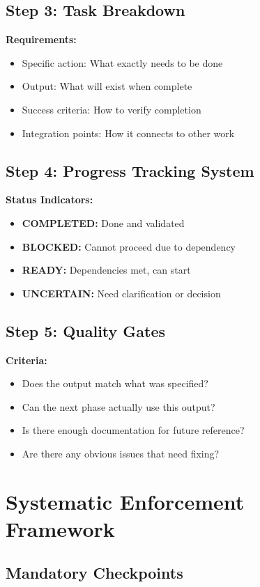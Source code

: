 \documentclass{article}
\begin{document}
\subsection{Step 3: Task Breakdown}
\textbf{Requirements:}
\begin{itemize}[noitemsep]
\item Specific action: What exactly needs to be done
\item Output: What will exist when complete
\item Success criteria: How to verify completion
\item Integration points: How it connects to other work
\end{itemize}

\subsection{Step 4: Progress Tracking System}
\textbf{Status Indicators:}
\begin{itemize}[noitemsep]
\item \textbf{COMPLETED:} Done and validated
\item \textbf{BLOCKED:} Cannot proceed due to dependency
\item \textbf{READY:} Dependencies met, can start
\item \textbf{UNCERTAIN:} Need clarification or decision
\end{itemize}

\subsection{Step 5: Quality Gates}
\textbf{Criteria:}
\begin{itemize}[noitemsep]
\item Does the output match what was specified?
\item Can the next phase actually use this output?
\item Is there enough documentation for future reference?
\item Are there any obvious issues that need fixing?
\end{itemize}

\section{Systematic Enforcement Framework}

\subsection{Mandatory Checkpoints}
\end{document}
